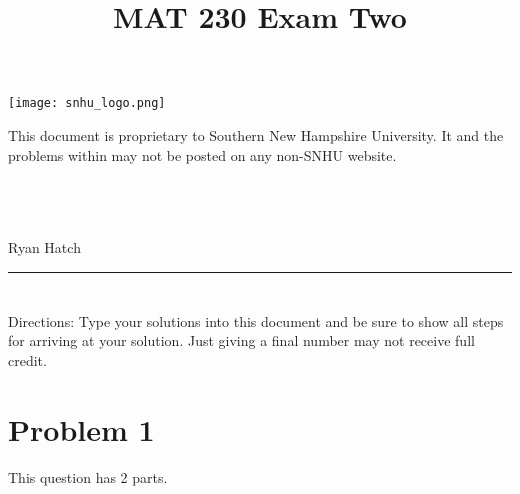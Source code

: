 \documentclass{amsart}
\theoremstyle{definition}
\theoremstyle{Exercise}
\theoremstyle{remark}
\theoremstyle{rule}
\numberwithin{equation}{section}
\begin{document}
	\title{\sf MAT 230 Exam Two}%


	\begin{center}
		\texttt{[image: snhu\_logo.png]}
	\end{center}

	\maketitle
	This document is proprietary to Southern New Hampshire University. It and the
	problems within may not be posted on any non-SNHU website.\\\\\\\\
	\begin{center}
		Ryan Hatch
	\end{center}

	\begin{center}
		\rule{\textwidth}{0.4pt}
	\end{center}
	\newpage
	\section*{}
	\section*{}
	Directions: Type your solutions into this document and be sure to show all steps
	for arriving at your solution. Just giving a final number may not receive full
	credit. \\
	\section*{Problem 1}
	\noindent
	This question has 2 parts.
\end{document}

